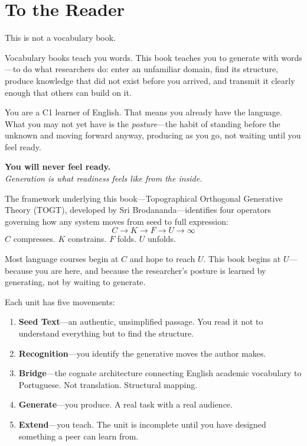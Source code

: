 \documentclass[11pt, twoside, openright]{book}
\theoremstyle{plain}
\theoremstyle{definition}
\begin{document}
\cleardoublepage

\chapter*{To the Reader}

This is not a vocabulary book.

Vocabulary books teach you words. This book teaches
you to generate with words---to do what researchers
do: enter an unfamiliar domain, find its structure, produce
knowledge that did not exist before you arrived, and
transmit it clearly enough that others can build on it.

You are a C1 learner of English. That means you already
have the language. What you may not yet have is the
\textit{posture}---the habit of standing before the unknown
and moving forward anyway, producing as you go, not
waiting until you feel ready.

\begin{center}
\textbf{You will never feel ready.}\\[4pt]
\textit{Generation is what readiness feels like from the inside.}
\end{center}

The framework underlying this book---Topographical Orthogonal
Generative Theory (TOGT), developed by Sri Brodananda---identifies
four operators governing how any system moves from seed to full
expression:
\[
C \longrightarrow K \longrightarrow F \longrightarrow U \longrightarrow \infty
\]
$C$ compresses. $K$ constrains. $F$ folds. $U$ unfolds.

Most language courses begin at $C$ and hope to reach $U$.
This book begins at $U$---because you are here, and because
the researcher's posture is learned by generating, not by
waiting to generate.

Each unit has five movements:
\begin{enumerate}[leftmargin=*, label=\arabic*.]
  \item \textbf{Seed Text}---an authentic, unsimplified passage.
    You read it not to understand everything but to find the structure.
  \item \textbf{Recognition}---you identify the generative moves
    the author makes.
  \item \textbf{Bridge}---the cognate architecture connecting
    English academic vocabulary to Portuguese. Not translation.
    Structural mapping.
  \item \textbf{Generate}---you produce. A real task with a real audience.
  \item \textbf{Extend}---you teach. The unit is incomplete until
    you have designed something a peer can learn from.
\end{enumerate}
\end{document}
